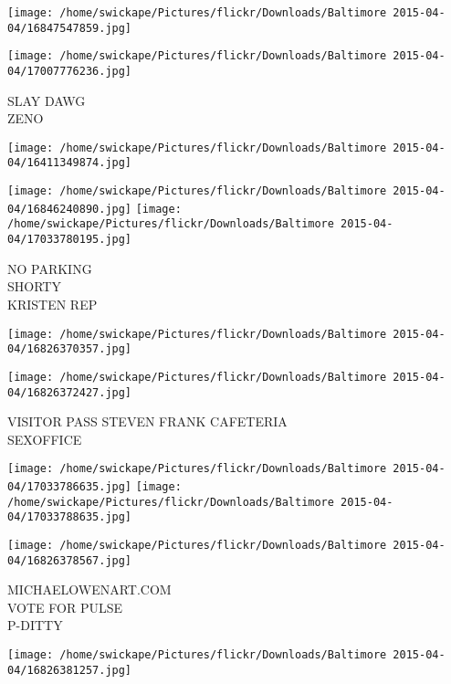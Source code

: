 \documentclass[10pt,letterpaper]{article}
\begin{document}
\texttt{[image: /home/swickape/Pictures/flickr/Downloads/Baltimore 2015-04-04/16847547859.jpg]}

\vspace{0.25in}
\texttt{[image: /home/swickape/Pictures/flickr/Downloads/Baltimore 2015-04-04/17007776236.jpg]}

SLAY DAWG\\
ZENO\\
\pagebreak

\texttt{[image: /home/swickape/Pictures/flickr/Downloads/Baltimore 2015-04-04/16411349874.jpg]}

\vspace{0.25in}
\texttt{[image: /home/swickape/Pictures/flickr/Downloads/Baltimore 2015-04-04/16846240890.jpg]}
\texttt{[image: /home/swickape/Pictures/flickr/Downloads/Baltimore 2015-04-04/17033780195.jpg]}

NO PARKING\\
SHORTY\\
KRISTEN REP\\
\pagebreak

\texttt{[image: /home/swickape/Pictures/flickr/Downloads/Baltimore 2015-04-04/16826370357.jpg]}

\vspace{0.25in}
\texttt{[image: /home/swickape/Pictures/flickr/Downloads/Baltimore 2015-04-04/16826372427.jpg]}

VISITOR PASS STEVEN FRANK CAFETERIA\\
SEXOFFICE\\
\pagebreak

\texttt{[image: /home/swickape/Pictures/flickr/Downloads/Baltimore 2015-04-04/17033786635.jpg]}
\texttt{[image: /home/swickape/Pictures/flickr/Downloads/Baltimore 2015-04-04/17033788635.jpg]}

\vspace{0.25in}
\texttt{[image: /home/swickape/Pictures/flickr/Downloads/Baltimore 2015-04-04/16826378567.jpg]}

MICHAELOWENART.COM\\
VOTE FOR PULSE\\
P{-}DITTY\\
\pagebreak

\texttt{[image: /home/swickape/Pictures/flickr/Downloads/Baltimore 2015-04-04/16826381257.jpg]}
\end{document}
